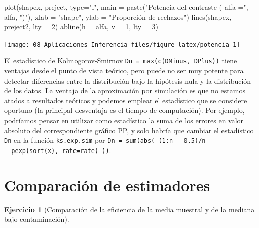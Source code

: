 \documentclass[
]{book}
\newenvironment{Shaded}{\begin{snugshade}}{\end{snugshade}}
\newcommand{\AttributeTok}[1]{\textcolor[rgb]{0.77,0.63,0.00}{#1}}
\newcommand{\DecValTok}[1]{\textcolor[rgb]{0.00,0.00,0.81}{#1}}
\newcommand{\FunctionTok}[1]{\textcolor[rgb]{0.00,0.00,0.00}{#1}}
\newcommand{\NormalTok}[1]{#1}
\newcommand{\StringTok}[1]{\textcolor[rgb]{0.31,0.60,0.02}{#1}}
\theoremstyle{break}
\theoremstyle{definition}
\theoremstyle{definition}
\theoremstyle{definition}
\newtheorem{exercise}{Ejercicio}[chapter]
\theoremstyle{definition}
\theoremstyle{remark}
\begin{document}
\begin{enumerate}
\begin{Shaded}
\begin{Highlighting}[]
\FunctionTok{plot}\NormalTok{(shapex, preject, }\AttributeTok{type=}\StringTok{"l"}\NormalTok{, }\AttributeTok{main =} \FunctionTok{paste}\NormalTok{(}\StringTok{"Potencia del contraste ( alfa ="}\NormalTok{, alfa, }\StringTok{")"}\NormalTok{), }
     \AttributeTok{xlab =} \StringTok{"shape"}\NormalTok{, }\AttributeTok{ylab =} \StringTok{"Proporción de rechazos"}\NormalTok{)}
\FunctionTok{lines}\NormalTok{(shapex, preject2, }\AttributeTok{lty =} \DecValTok{2}\NormalTok{)}
\FunctionTok{abline}\NormalTok{(}\AttributeTok{h =}\NormalTok{ alfa, }\AttributeTok{v =} \DecValTok{1}\NormalTok{, }\AttributeTok{lty =} \DecValTok{3}\NormalTok{)}
\end{Highlighting}
\end{Shaded}

  \begin{center}\texttt{[image: 08-Aplicaciones\_Inferencia\_files/figure-latex/potencia-1]} \end{center}
\end{enumerate}

El estadístico de Kolmogorov-Smirnov \texttt{Dn\ =\ max(c(DMinus,\ DPlus))} tiene ventajas desde el
punto de vista teórico, pero puede no ser muy potente para detectar diferencias entre la
distribución bajo la hipótesis nula y la distribución de los datos.
La ventaja de la aproximación por simulación es que no estamos atados a resultados teóricos
y podemos emplear el estadístico que se considere oportuno
(la principal desventaja es el tiempo de computación).
Por ejemplo, podríamos pensar en utilizar como estadístico la suma de los errores en
valor absoluto del correspondiente gráfico PP, y solo habría que cambiar el estadístico
\texttt{Dn} en la función \texttt{ks.exp.sim} por \texttt{Dn\ =\ sum(abs(\ (1:n\ -\ 0.5)/n\ -\ \ pexp(sort(x),\ rate=rate)\ ))}.

\hypertarget{comparaciuxf3n-de-estimadores}{%
\section{Comparación de estimadores}\label{comparaciuxf3n-de-estimadores}}

\begin{exercise}[Comparación de la eficiencia de la media muestral y de la mediana bajo contaminación]
\protect\hypertarget{exr:media-median}{}{\label{exr:media-median} {} }
\end{exercise}
\end{document}
